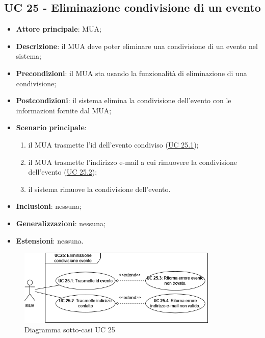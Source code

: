 \subsection{UC 25 - Eliminazione condivisione di un evento} \label{sec:UC25}

    \begin{itemize}
        \item \textbf{Attore principale}: MUA;
        \item \textbf{Descrizione}: il MUA deve poter eliminare una condivisione di un evento nel sistema;
        \item \textbf{Precondizioni}: il MUA sta usando la funzionalità di eliminazione di una condivisione;
        \item \textbf{Postcondizioni}: il sistema elimina la condivisione dell'evento con le informazioni fornite dal MUA;
        \item \textbf{Scenario principale}:
            \begin{enumerate}
                \item il MUA trasmette l'id dell'evento condiviso (\hyperref[sec:UC25.1]{UC 25.1});
                \item il MUA trasmette l'indirizzo e-mail a cui rimuovere la condivisione dell'evento (\hyperref[sec:UC25.2]{UC 25.2});
                \item il sistema rimuove la condivisione dell'evento.
            \end{enumerate}
        \item \textbf{Inclusioni}: nessuna;
        \item \textbf{Generalizzazioni}: nessuna;
        \item \textbf{Estensioni}: nessuna.
    \end{itemize}

    \begin{figure}[H]
        \includegraphics[width=0.85\textwidth]{sections/uc_imgs/UC25.png}
        \centering
        \caption{Diagramma sotto-casi UC 25}
    \end{figure}

